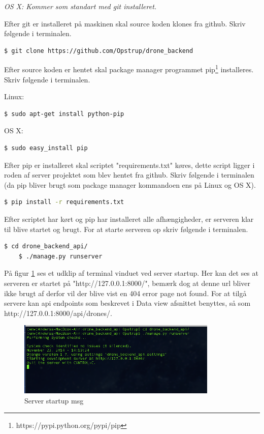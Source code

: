 \textit{OS X: Kommer som standart med git installeret.}

Efter git er installeret på maskinen skal source koden klones fra github. Skriv følgende i terminalen.

\begin{lstlisting}[language=bash]
	$ git clone https://github.com/Opstrup/drone_backend
\end{lstlisting}

Efter source koden er hentet skal package manager programmet pip\footnote{https://pypi.python.org/pypi/pip} installeres. Skriv følgende i terminalen.

Linux:
\begin{lstlisting}[language=bash]
	$ sudo apt-get install python-pip
\end{lstlisting}

OS X:
\begin{lstlisting}[language=bash]
	$ sudo easy_install pip
\end{lstlisting}

Efter pip er installeret skal scriptet "requirements.txt" køres, dette script ligger i roden af server projektet som blev hentet fra github. Skriv følgende i terminalen (da pip bliver brugt som package manager kommandoen ens på Linux og OS X). \\

\begin{lstlisting}[language=bash]
	$ pip install -r requirements.txt
\end{lstlisting}

Efter scriptet har kørt og pip har installeret alle afhængigheder, er serveren klar til blive startet og brugt. For at starte serveren op skriv følgende i terminalen.

\begin{lstlisting}[language=bash]
	$ cd drone_backend_api/
	$ ./manage.py runserver
\end{lstlisting}


På figur \ref{fig:server_startup} ses et udklip af terminal vinduet ved server startup. Her kan det ses at serveren er startet på "http://127.0.0.1:8000/", bemærk dog at denne url bliver ikke brugt af derfor vil der blive vist en 404 error page not found. For at tilgå servere kan api endpoints som beskrevet i Data view afsnittet benyttes, så som http://127.0.0.1:8000/api/drones/.
\begin{figure}[H]
	\centering
	\includegraphics[width=0.85\textwidth]{Billeder/implementation/server_startup.png}
	\caption{Server startup msg}
	\label{fig:server_startup}
\end{figure}
\newpage

